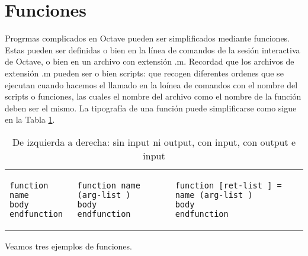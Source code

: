 \section{Funciones}
Progrmas complicados en Octave pueden ser simplificados mediante funciones. Estas pueden ser definidas o bien en la línea de comandos de la sesión interactiva de Octave, o bien en un archivo con extensión .m. Recordad que los archivos de extensión .m pueden ser o bien scripts: que recogen diferentes ordenes que se ejecutan cuando hacemos el llamado en la loínea de comandos con el nombre del scripts o funciones, las cuales el nombre del archivo como el nombre de la función deben ser el mismo. La tipografía de una función puede  simplificarse como sigue en la Tabla \ref{tab:function}.
\begin{table}[!ht] 
\begin{mybox}%
\begin{tabular}{l|l|l}
    \begin{minipage}{0.2\linewidth}
\begin{verbatim} 
function name
body
endfunction
\end{verbatim}
\end{minipage}&
    \begin{minipage}{0.3\linewidth}
\begin{verbatim} 
function name (arg-list )
body
endfunction
\end{verbatim}    
    \end{minipage}&
    \begin{minipage}{0.4\linewidth}
\begin{verbatim} 
function [ret-list ] = name (arg-list )
body
endfunction
\end{verbatim}    
\end{minipage}\\
 \end{tabular}
\end{mybox}\caption{De izquierda a derecha: sin input ni output, con input, con output e input}\label{tab:function}
\end{table}

Veamos tres ejemplos de funciones.

